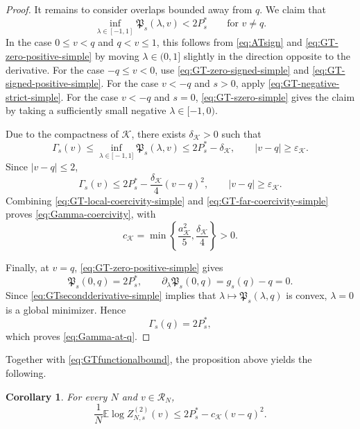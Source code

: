 \documentclass[11pt]{article}
\newtheorem{corollary}[theorem]{Corollary}
\numberwithin{equation}{section}
\newcommand{\E}{\mathbb{E}}
\newcommand{\1}{\mathbf 1}
\newcommand{\cK}{\mathcal K}
\begin{document}
\begin{proof}
It remains to consider overlaps bounded away from $q$.  We claim that
\begin{equation}
\inf_{\lambda\in [-1,1]}
 \mathfrak P_s(\lambda,v)<2P_s^*
 \qquad\text{for }v\ne q.
 \label{eq:GT-pointwise-gap-simple}
\end{equation}
In  the case $0\le v<q$ and $q<v\le1$, this follows from  \eqref{eq:ATsign} and \eqref{eq:GT-zero-positive-simple}  by moving
$\lambda\in (0,1]$ slightly in the direction opposite to the derivative.
For the case $-q\le v<0$, use \eqref{eq:GT-zero-signed-simple} and \eqref{eq:GT-signed-positive-simple}.
For  the case $v<-q$ and $s>0$, apply \eqref{eq:GT-negative-strict-simple}.
For  the case $v<-q$ and $s=0$, \eqref{eq:GT-szero-simple} gives the claim by taking a sufficiently small negative $\lambda\in [-1,0)$.

Due to the compactness of $\cK$, there exists $\delta _{\cK}>0$ such that
\[
 \Gamma_s(v)\le \inf_{\lambda\in\mathbb [-1,1]}
 \mathfrak P_s(\lambda,v)\le2P_s^*-\delta _{\cK},
 \qquad |v-q|\ge\varepsilon_{\cK}.
\]
Since $|v-q|\le2$,
\begin{equation}
 \Gamma_s(v)
 \le
 2P_s^*-\frac{\delta _{\cK}}4(v-q)^2,
 \qquad |v-q|\ge\varepsilon_{\cK}.
 \label{eq:GT-far-coercivity-simple}
\end{equation}
Combining \eqref{eq:GT-local-coercivity-simple} and
\eqref{eq:GT-far-coercivity-simple} proves
\eqref{eq:Gamma-coercivity}, with
\[
 c_{\cK}
 =
 \min\left\{
 \frac{a_{\cK}^2}{5},
 \frac{\delta _{\cK}}4
 \right\}>0.
\]

Finally, at $v=q$, \eqref{eq:GT-zero-positive-simple} gives
\[
 \mathfrak P_s(0,q)=2P_s^*,
 \qquad
 \partial_\lambda\mathfrak P_s(0,q)=g_s(q)-q=0.
\]
Since \eqref{eq:GTsecondderivative-simple} implies that $\lambda\mapsto\mathfrak P_s(\lambda,q)$ is convex, $\lambda=0$ is
a global minimizer.  Hence
\[
 \Gamma_s(q)=2P_s^*,
\]
which proves \eqref{eq:Gamma-at-q}.
\end{proof}
Together with \eqref{eq:GTfunctionalbound}, the proposition above yields the following. 
\begin{corollary}
        For every $N$ and $v\in\mathcal R_N$,
\begin{equation}
 \frac1N\E\log Z^{(2)}_{N,s}(v)
 \le 2P_s^*-c_{\cK}(v-q)^2.
 \label{eq:GTcoercivity}
\end{equation}
\end{corollary}
\end{document}
